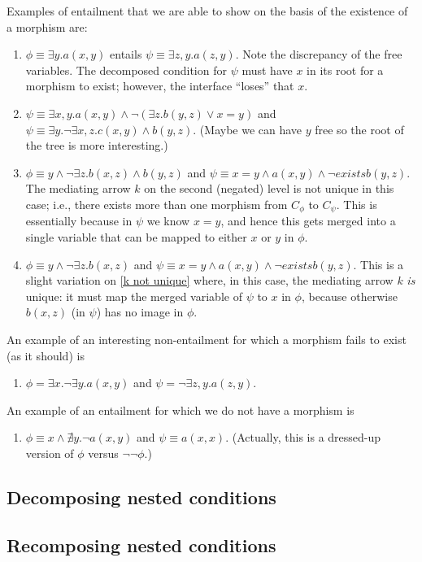 Examples of entailment that we are able to show on the basis of the existence of a morphism are:
%
\begin{enumerate}
\item\label{no pullback} $\phi\equiv \exists y. a(x,y)$ entails $\psi\equiv \exists z,y. a(z,y)$. Note the discrepancy of the free variables. The decomposed condition for $\psi$ must have $x$ in its root for a morphism to exist; however, the interface ``loses'' that $x$.
  
\item $\psi\equiv \exists x,y. a(x,y) \wedge \neg (\exists z.b(y,z) \vee x=y)$ and $\psi\equiv \exists y.\neg \exists x,z.c(x,y)\wedge b(y,z)$. (Maybe we can have $y$ free so the root of the tree is more interesting.)
  
\item\label{k not unique} $\phi\equiv y\wedge \neg\exists z.b(x,z)\wedge b(y,z)$ and $\psi\equiv x=y\wedge a(x,y)\wedge \neg exists b(y,z)$. The mediating arrow $k$ on the second (negated) level is not unique in this case; i.e., there exists more than one morphism from $C_\phi$ to $C_\psi$. This is essentially because in $\psi$ we know $x=y$, and hence this gets merged into a single variable that can be mapped to either $x$ or $y$ in $\phi$.
  
\item $\phi\equiv y\wedge \neg\exists z.b(x,z)$ and $\psi\equiv x=y\wedge a(x,y)\wedge \neg exists b(y,z)$. This is a slight variation on \ref{k not unique} where, in this case, the mediating arrow $k$ \emph{is} unique: it must map the merged variable of $\psi$ to $x$ in $\phi$, because otherwise $b(x,z)$ (in $\psi$) has no image in $\phi$.
\end{enumerate}
%
An example of an interesting non-entailment for which a morphism fails to exist (as it should) is
%
\begin{enumerate}[resume]
\item $\phi=\exists x.\neg\exists y.a(x,y)$ and $\psi=\neg\exists z,y. a(z,y)$.
\end{enumerate}
%
An example of an entailment for which we do not have a morphism is
%
\begin{enumerate}[resume]
\item $\phi\equiv x\wedge \nexists y.\neg a(x,y)$ and $\psi\equiv a(x,x)$. (Actually, this is a dressed-up version of $\phi$ versus $\neg\neg\phi$.)
\end{enumerate}



\subsection{Decomposing nested conditions}

\subsection{Recomposing nested conditions}

